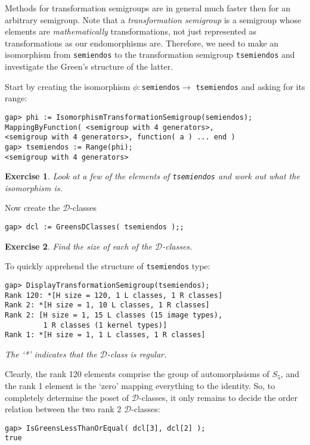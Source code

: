 \documentclass{ws-p8-50x6-00}
\theoremstyle{plain} \newtheorem{Thm}{Theorem}
\theoremstyle{plain} \newtheorem{Cor}{Corollary}
\theoremstyle{plain} \newtheorem{Lemma}{Lemma}
\theoremstyle{plain} \newtheorem{Prop}{Proposition}
\theoremstyle{plain} \newtheorem{Ex}{Exercise}
\def\d{${\mathcal{D}}$}
\begin{document}
Methods for transformation semigroups are in general
much faster then for an arbitrary semigroup. Note that a 
{\em transformation semigroup} is a semigroup whose 
elements are {\em mathematically} transformations, not
just represented as transformations as our endomorphisms are.
Therefore, we need to make 
an isomorphism from {\tt semiendos} to the transformation semigroup
{\tt tsemiendos} and investigate the Green's structure of the latter. 

Start by creating the isomorphism $\phi : $\texttt{semiendos}$\rightarrow$ 
\texttt{tsemiendos} and asking for its range:
\begin{verbatim}
gap> phi := IsomorphismTransformationSemigroup(semiendos);
MappingByFunction( <semigroup with 4 generators>, 
<semigroup with 4 generators>, function( a ) ... end )
gap> tsemiendos := Range(phi);
<semigroup with 4 generators>
\end{verbatim}
\begin{Ex}
Look at a few of the elements of {\tt tsemiendos} and work out
what the isomorphism is.
\end{Ex}

Now create the $\mathcal{D}$-classes
\begin{verbatim}
gap> dcl := GreensDClasses( tsemiendos );;
\end{verbatim}

\begin{Ex}
Find the size of each of the $\mathcal{D}$-classes.
\end{Ex}

To quickly apprehend the structure of {\tt tsemiendos} type:
\begin{verbatim}
gap> DisplayTransformationSemigroup(tsemiendos);
Rank 120: *[H size = 120, 1 L classes, 1 R classes]
Rank 2: *[H size = 1, 10 L classes, 1 R classes]
Rank 2: [H size = 1, 15 L classes (15 image types), 
         1 R classes (1 kernel types)]
Rank 1: *[H size = 1, 1 L classes, 1 R classes]
\end{verbatim}
{\em The `*' indicates that the \d-class is regular.}

Clearly, the rank 120 elements comprise the group of automorphsisms
of $S_5$, and the rank 1 element is the `zero' mapping everything to the 
identity. So, to completely determine the poset of 
$\mathcal{D}$-classes,  it only remains to decide the order relation
between the two rank 2 \d-classes:
\begin{verbatim}
gap> IsGreensLessThanOrEqual( dcl[3], dcl[2] );
true
\end{verbatim}
\end{document}
